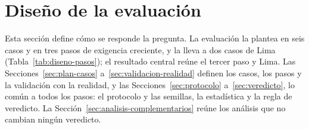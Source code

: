 \section{Diseño de la evaluación}
\label{sec:plan}
\label{sec:plan2}

Esta sección define cómo se responde la pregunta. La evaluación la
plantea en seis casos y en tres pasos de exigencia creciente, y la lleva
a dos casos de Lima (Tabla~\ref{tab:diseno-pasos}); el resultado central
reúne el tercer paso y Lima. Las Secciones~\ref{sec:plan-casos}
a~\ref{sec:validacion-realidad} definen los casos, los pasos y la
validación con la realidad, y las Secciones~\ref{sec:protocolo}
a~\ref{sec:veredicto}, lo común a todos los pasos: el protocolo y las
semillas, la estadística y la regla de veredicto. La
Sección~\ref{sec:analisis-complementarios} reúne los análisis que no
cambian ningún veredicto.

